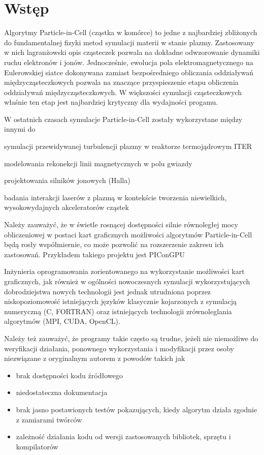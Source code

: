 \section[Wstęp]{Wstęp} %
Algorytmy Particle-in-Cell (cząstka w komórce) to jedne z najbardziej zbliżonych do fundamentalnej fizyki
metod symulacji materii w stanie plazmy. Zastosowany w nich lagranżowski opis cząsteczek pozwala na dokładne
odwzorowanie dynamiki ruchu elektronów i jonów. Jednocześnie, ewolucja pola elektromagnetycznego na Eulerowskiej
siatce dokonywana zamiast bezpośredniego obliczania oddziaływań międzycząsteczkowych pozwala na znaczące
przyspieszenie etapu obliczenia oddziaływań międzycząsteczkowych. W większości symulacji cząsteczkowych właśnie
ten etap jest najbardziej krytyczny dla wydajności progamu.

W ostatnich czasach symulacje Particle-in-Cell zostały wykorzystane między innymi do
\item symulacji przewidywanej turbulencji plazmy w reaktorze termojądrowym ITER \cite{pic-hammett}
\item modelowania rekonekcji linii magnetycznych w polu gwiazdy \cite{pic-reconnection}
\item projektowania silników jonowych (Halla) \cite{pic-hallengine}
\item badania interakcji laserów z plazmą w kontekście tworzenia niewielkich,
    wysokowydajnych akceleratorów cząstek \cite{pic-laserplasma}

    Należy zauważyć, że w świetle rosnącej dostępności silnie równoległej mocy obliczeniowej w postaci kart graficznych
    możliwości algorytmów Particle-in-Cell będą rosły współmiernie, co może pozwolić na rozszerzenie zakresu ich zastosowań.
    Przykładem takiego projektu jest PIConGPU \cite{picongpu}

    Inżynieria oprogramowania zorientowanego na wykorzystanie możliwości kart graficznych,
    jak również w ogólności nowoczesnych symulacji wykorzystujących dobrodziejstwa nowych technologii
    jest jednak utrudniona poprzez niskopoziomowość istniejących języków klasycznie
    kojarzonych z symulacją numeryczną (C, FORTRAN) oraz istniejących technologii zrównoleglania
    algorytmów (MPI, CUDA, OpenCL).

    Należy też zauważyć, że programy takie często są
    trudne, jeżeli nie niemożliwe do weryfikacji działania, ponownego wykorzystania
    i modyfikacji przez osoby niezwiązane z oryginalnym autorem z powodów takich jak
    \begin{itemize}
        \item brak dostępności kodu źródłowego
        \item niedostateczna dokumentacja
        \item brak jasno postawionych testów pokazujących, kiedy algorytm działa zgodnie z zamiarami twórców
        \item zależność działania kodu od wersji zastosowanych bibliotek, sprzętu i kompilatorów
    \end{itemize}

